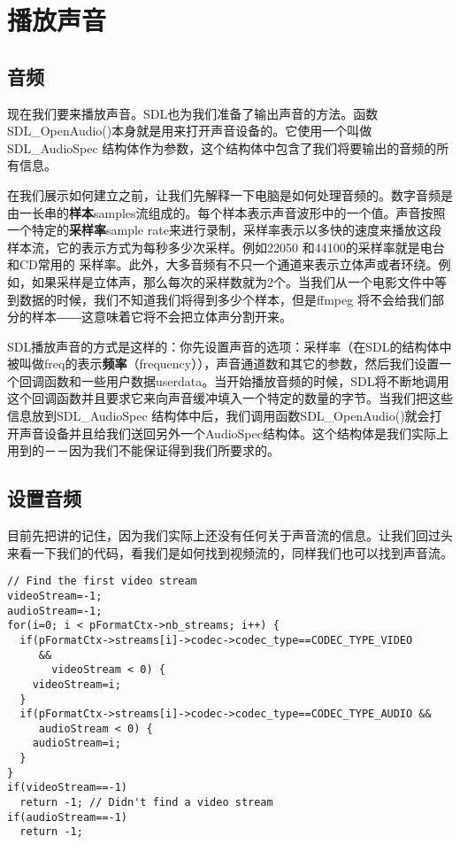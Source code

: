 ﻿\chapter{播放声音}
\label{ch3}
\section{音频}
现在我们要来播放声音。SDL也为我们准备了输出声音的方法。函数SDL_OpenAudio()本身就是用来打开声音设备的。它使用一个叫做SDL_AudioSpec 结构体作为参数，这个结构体中包含了我们将要输出的音频的所有信息。

在我们展示如何建立之前，让我们先解释一下电脑是如何处理音频的。数字音频是由一长串的\textbf{样本}{samples}流组成的。每个样本表示声音波形中的一个值。声音按照一个特定的\textbf{采样率}{sample rate}来进行录制，采样率表示以多快的速度来播放这段样本流，它的表示方式为每秒多少次采样。例如22050 和44100的采样率就是电台和CD常用的 采样率。此外，大多音频有不只一个通道来表示立体声或者环绕。例如，如果采样是立体声，那么每次的采样数就为2个。当我们从一个电影文件中等到数据的时候，我们不知道我们将得到多少个样本，但是ffmpeg 将不会给我们部分的样本――这意味着它将不会把立体声分割开来。

SDL播放声音的方式是这样的：你先设置声音的选项：采样率（在SDL的结构体中被叫做freq的表示\textbf{频率}（frequency）），声音通道数和其它的参数，然后我们设置一个回调函数和一些用户数据userdata。当开始播放音频的时候，SDL将不断地调用这个回调函数并且要求它来向声音缓冲填入一个特定的数量的字节。当我们把这些信息放到SDL_AudioSpec 结构体中后，我们调用函数SDL_OpenAudio()就会打开声音设备并且给我们送回另外一个AudioSpec结构体。这个结构体是我们实际上用到的－－因为我们不能保证得到我们所要求的。

\section{设置音频}

目前先把讲的记住，因为我们实际上还没有任何关于声音流的信息。让我们回过头来看一下我们的代码，看我们是如何找到视频流的，同样我们也可以找到声音流。

\begin{lstlisting}
// Find the first video stream
videoStream=-1;
audioStream=-1;
for(i=0; i < pFormatCtx->nb_streams; i++) {
  if(pFormatCtx->streams[i]->codec->codec_type==CODEC_TYPE_VIDEO
     &&
       videoStream < 0) {
    videoStream=i;
  }
  if(pFormatCtx->streams[i]->codec->codec_type==CODEC_TYPE_AUDIO &&
     audioStream < 0) {
    audioStream=i;
  }
}
if(videoStream==-1)
  return -1; // Didn't find a video stream
if(audioStream==-1)
  return -1;
\end{lstlisting}

